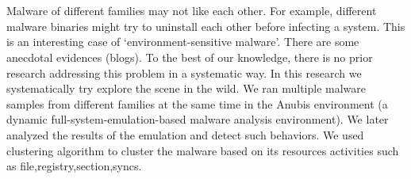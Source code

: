 \chapter{\abstractname}

Malware of different families may not like each other.
For example, different malware binaries might try to uninstall each other before infecting a system.
This is an interesting case of `environment-sensitive malware'.
There are some anecdotal evidences (blogs).
To the best of our knowledge, there is no prior research addressing this problem in a systematic way.
In this research we systematically try explore the scene in the wild.
We ran multiple malware samples from different families at the same time in the Anubis environment (a dynamic full-system-emulation-based malware analysis environment).
We later analyzed the results of the emulation and detect such behaviors.
We used clustering algorithm to cluster the malware based on its resources activities such as file,registry,section,syncs.



